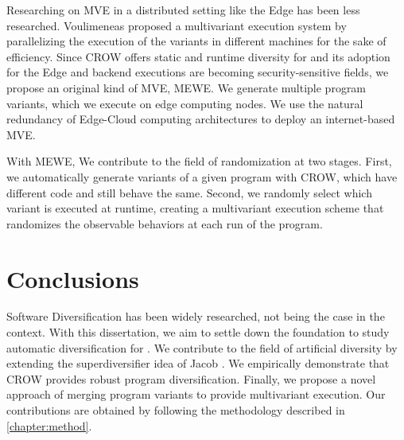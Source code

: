 Researching on MVE in a distributed setting like the Edge \citationneeded has been less researched. Voulimeneas \etal proposed a multivariant execution system by parallelizing the execution of the variants in different machines \cite{voulimeneas2021dmvx} for the sake of efficiency. Since CROW offers static and runtime diversity for \wasm and its adoption for the Edge and backend executions are becoming security-sensitive fields, we propose an original kind of MVE, MEWE. We generate multiple program variants, which we execute on edge computing nodes. We use the natural redundancy of Edge-Cloud computing architectures to deploy an internet-based MVE.

With MEWE, We contribute to the field of randomization at two stages. First, we automatically generate variants of a given program with CROW, which have different \wasm code and still behave the same. Second, we randomly select which variant is executed at runtime, creating a multivariant execution scheme that randomizes the observable behaviors at each run of the program.



\section{Conclusions}
\label{sota:conclusions}

Software Diversification has been widely researched, not being the case in the \wasm context. With this dissertation, we aim to settle down the foundation to study automatic diversification for \wasm. We contribute to the field of artificial diversity by extending the superdiversifier idea of Jacob \etal \cite{jacob2008superdiversifier}. We empirically demonstrate that CROW provides robust program diversification. Finally, we propose a novel approach of merging program variants to provide multivariant execution. Our
contributions are obtained by following the methodology described in \autoref{chapter:method}. 



